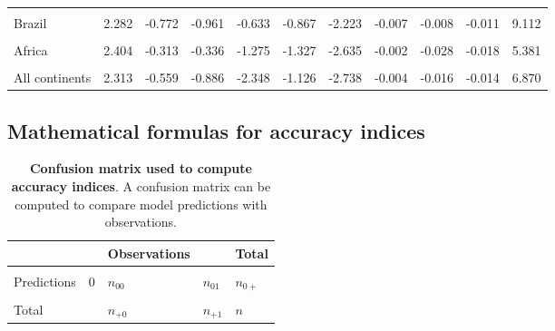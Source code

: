 \documentclass[
  12pt,
]{article}
\begin{document}
\begin{longtable}[t]{lrrrrrrrrrr}
\endfoot
\bottomrule
\endlastfoot
\cellcolor{gray!6}{India} & \cellcolor{gray!6}{2.246} & \cellcolor{gray!6}{-0.374} & \cellcolor{gray!6}{-0.965} & \cellcolor{gray!6}{-1.551} & \cellcolor{gray!6}{-4.569} & \cellcolor{gray!6}{-11.080} & \cellcolor{gray!6}{0.000} & \cellcolor{gray!6}{-0.028} & \cellcolor{gray!6}{-0.011} & \cellcolor{gray!6}{2.193}\\
Brazil & 2.282 & -0.772 & -0.961 & -0.633 & -0.867 & -2.223 & -0.007 & -0.008 & -0.011 & 9.112\\
\cellcolor{gray!6}{America} & \cellcolor{gray!6}{2.501} & \cellcolor{gray!6}{-0.608} & \cellcolor{gray!6}{-1.111} & \cellcolor{gray!6}{-1.626} & \cellcolor{gray!6}{-0.874} & \cellcolor{gray!6}{-2.382} & \cellcolor{gray!6}{-0.006} & \cellcolor{gray!6}{-0.010} & \cellcolor{gray!6}{-0.013} & \cellcolor{gray!6}{7.860}\\
Africa & 2.404 & -0.313 & -0.336 & -1.275 & -1.327 & -2.635 & -0.002 & -0.028 & -0.018 & 5.381\\
\cellcolor{gray!6}{Asia} & \cellcolor{gray!6}{1.776} & \cellcolor{gray!6}{-0.678} & \cellcolor{gray!6}{-0.876} & \cellcolor{gray!6}{-5.109} & \cellcolor{gray!6}{-1.535} & \cellcolor{gray!6}{-3.690} & \cellcolor{gray!6}{-0.003} & \cellcolor{gray!6}{-0.018} & \cellcolor{gray!6}{-0.012} & \cellcolor{gray!6}{5.923}\\
All continents & 2.313 & -0.559 & -0.886 & -2.348 & -1.126 & -2.738 & -0.004 & -0.016 & -0.014 & 6.870\\*
\end{longtable}
\endgroup{}

\newpage

\hypertarget{mathematical-formulas-for-accuracy-indices}{%
\subsection{Mathematical formulas for accuracy indices}\label{mathematical-formulas-for-accuracy-indices}}



\begin{table}[H]

\caption{\label{tab:confusion-matrix}\textbf{Confusion matrix used to compute accuracy indices}. A confusion matrix can be computed to compare model predictions with observations.\vspace{0.5cm}}
\centering
\begin{tabular}[t]{lllll}
\toprule
 &  & Observations &  & Total\\
\midrule
\cellcolor{gray!6}{} & \cellcolor{gray!6}{} & \cellcolor{gray!6}{0 (non-deforested)} & \cellcolor{gray!6}{1 (deforested)} & \cellcolor{gray!6}{}\\
Predictions & 0 & $n_{00}$ & $n_{01}$ & $n_{0+}$\\
\cellcolor{gray!6}{} & \cellcolor{gray!6}{1} & \cellcolor{gray!6}{$n_{10}$} & \cellcolor{gray!6}{$n_{11}$} & \cellcolor{gray!6}{$n_{1+}$}\\
Total &  & $n_{+0}$ & $n_{+1}$ & $n$\\
\bottomrule
\end{tabular}
\end{table}
\end{document}
